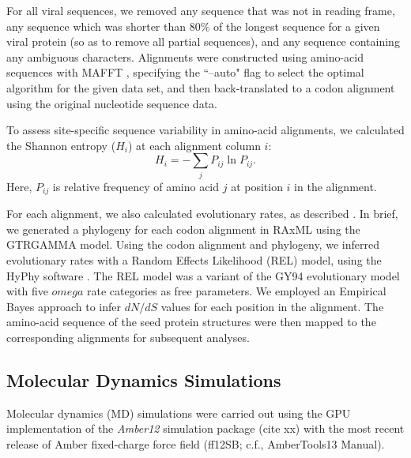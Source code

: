 \documentclass[12pt]{article}
\begin{document}
For all viral sequences, we removed any sequence that was not in reading frame, any sequence which was shorter than 80\% of the longest sequence for a given viral protein (so as to remove all partial sequences), and any sequence containing any ambiguous characters. Alignments were constructed using amino-acid sequences with MAFFT \citep{Katohetal2002,Katohetal2005}, specifying the ``--auto" flag to select the optimal algorithm for the given data set, and then back-translated to a codon alignment using the original nucleotide sequence data.

To assess site-specific sequence variability in amino-acid alignments, we calculated the Shannon entropy ($H_i$) at each alignment column $i$:
\begin{equation}
        H_i = - \sum_jP_{ij}\ln P_{ij}.
\end{equation}
Here, $P_{ij}$ is relative frequency of amino acid $j$ at position $i$ in the alignment.

For each alignment, we also calculated evolutionary rates, as described \citep{SpielmanWilke2013}. In brief, we generated a phylogeny for each codon alignment in RAxML \citep{RaxMLHPC} using the GTRGAMMA model. Using the codon alignment and phylogeny, we inferred evolutionary rates with a Random Effects Likelihood (REL) model, using the HyPhy software \citep{KosakovskyPondetal2005}. The REL model was a variant of the GY94 evolutionary model \citep{GoldmanYang1994} with five $omega$ rate categories as free parameters. We employed an Empirical Bayes approach \citep{Yang2000} to infer $dN/dS$ values for each position in the alignment. The amino-acid sequence of the seed protein structures were then mapped to the corresponding alignments for subsequent analyses.

\subsection*{Molecular Dynamics Simulations}

Molecular dynamics (MD) simulations were carried out using the GPU implementation of the {\it Amber12} simulation package (cite xx) with the most recent release of Amber fixed-charge force field (ff12SB; c.f., AmberTools13 Manual).
		
\end{document}
